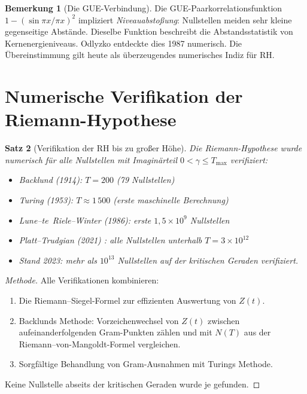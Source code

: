 \documentclass[12pt,a4paper]{amsart}
\newtheorem{theorem}{Satz}[section]
\theoremstyle{definition}
\newtheorem{remark}[theorem]{Bemerkung}
\begin{document}
\begin{remark}[Die GUE-Verbindung]
Die GUE-Paarkorrelationsfunktion $1 - (\sin\pi x/\pi x)^2$ impliziert
\emph{Niveauabsto\ss ung}: Nullstellen meiden sehr kleine gegenseitige Abst\"ande.
Dieselbe Funktion beschreibt die Abstandsstatistik von Kernenergieniveaus.
Odlyzko \cite{Odlyzko1987} entdeckte dies 1987 numerisch.
Die \"Ubereinstimmung gilt heute als \"uberzeugendes numerisches Indiz f\"ur RH.
\end{remark}

\section{Numerische Verifikation der Riemann-Hypothese}

\begin{theorem}[Verifikation der RH bis zu gro\ss er H\"ohe]
\label{thm:rh_verified}
Die Riemann-Hypothese wurde numerisch f\"ur alle Nullstellen mit
Imagin\"arteil $0 < \gamma \le T_{\max}$ verifiziert:
\begin{itemize}
  \item Backlund (1914): $T = 200$ (79 Nullstellen)
  \item Turing (1953): $T \approx 1\,500$ (erste maschinelle Berechnung)
  \item Lune--te~Riele--Winter (1986): erste $1{,}5 \times 10^9$ Nullstellen
  \item Platt--Trudgian (2021) \cite{Platt2021}: alle Nullstellen unterhalb
    $T = 3 \times 10^{12}$
  \item Stand 2023: mehr als $10^{13}$ Nullstellen auf der kritischen Geraden
    verifiziert.
\end{itemize}
\end{theorem}

\begin{proof}[Methode]
Alle Verifikationen kombinieren:
\begin{enumerate}
  \item Die Riemann--Siegel-Formel zur effizienten Auswertung von $Z(t)$.
  \item Backlunds Methode: Vorzeichenwechsel von $Z(t)$ zwischen aufeinanderfolgenden
    Gram-Punkten z\"ahlen und mit $N(T)$ aus der Riemann--von-Mangoldt-Formel
    vergleichen.
  \item Sorgf\"altige Behandlung von \glqq Gram-Ausnahmen\grqq{}
    mit Turings Methode.
\end{enumerate}
Keine Nullstelle abseits der kritischen Geraden wurde je gefunden.
\end{proof}
\end{document}
